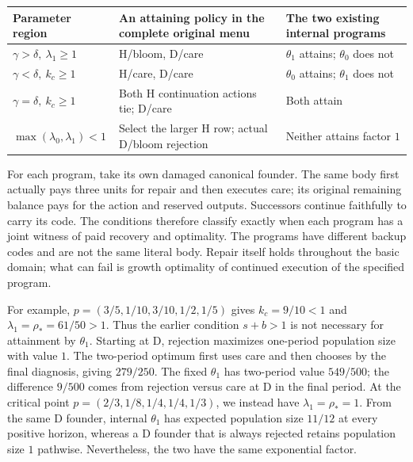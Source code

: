 \documentclass[
  english,
  11pt,
  oneside]{book}
\newcounter{none} %
\begin{document}
{\def\LTcaptype{none} %
\begin{longtable}[]{@{}
  >{\raggedright\arraybackslash}p{}
  >{\raggedright\arraybackslash}p{}
  >{\raggedright\arraybackslash}p{}@{}}
\toprule\noalign{}
\begin{minipage}[b]{\linewidth}\raggedright
Parameter region
\end{minipage} & \begin{minipage}[b]{\linewidth}\raggedright
An attaining policy in the complete original menu
\end{minipage} & \begin{minipage}[b]{\linewidth}\raggedright
The two existing internal programs
\end{minipage} \\
\midrule\noalign{}
\endhead
\bottomrule\noalign{}
\endlastfoot
\(\gamma>\delta,\ \lambda_1\ge1\) & H/bloom, D/care & \(\theta_1\) attains; \(\theta_0\) does not \\
\(\gamma<\delta,\ k_c\ge1\) & H/care, D/care & \(\theta_0\) attains; \(\theta_1\) does not \\
\(\gamma=\delta,\ k_c\ge1\) & Both H continuation actions tie; D/care & Both attain \\
\(\max(\lambda_0,\lambda_1)<1\) & Select the larger H row; actual D/bloom rejection & Neither attains factor \(1\) \\
\end{longtable}
}

For each program, take its own damaged canonical founder. The same body first actually pays three units for repair and then executes care; its original remaining balance pays for the action and reserved outputs. Successors continue faithfully to carry its code. The conditions therefore classify exactly when each program has a joint witness of paid recovery and optimality. The programs have different backup codes and are not the same literal body. Repair itself holds throughout the basic domain; what can fail is growth optimality of continued execution of the specified program.

For example, \(p=(3/5,1/10,3/10,1/2,1/5)\) gives \(k_c=9/10<1\) and \(\lambda_1=\rho_*=61/50>1\). Thus the earlier condition \(s+b>1\) is not necessary for attainment by \(\theta_1\). Starting at D, rejection maximizes one-period population size with value \(1\). The two-period optimum first uses care and then chooses by the final diagnosis, giving \(279/250\). The fixed \(\theta_1\) has two-period value \(549/500\); the difference \(9/500\) comes from rejection versus care at D in the final period. At the critical point \(p=(2/3,1/8,1/4,1/4,1/3)\), we instead have \(\lambda_1=\rho_*=1\). From the same D founder, internal \(\theta_1\) has expected population size \(11/12\) at every positive horizon, whereas a D founder that is always rejected retains population size \(1\) pathwise. Nevertheless, the two have the same exponential factor.
\end{document}

